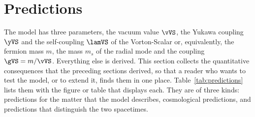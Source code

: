
\section{Predictions}
\label{sec:predictions}

The model has three parameters, the vacuum value $\vVS$, the Yukawa coupling $\yVS$ and the
self-coupling $\lamVS$ of the Vorton-Scalar or, equivalently, the fermion mass $m$, the mass $m_s$
of the radial mode and the coupling $\gVS=m/\vVS$. Everything else is derived. This section collects
the quantitative consequences that the preceding sections derived, so that a reader who wants to
test the model, or to extend it, finds them in one place. Table~\ref{tab:predictions} lists them
with the figure or table that displays each. They are of three kinds: predictions for the matter
that the model describes, cosmological predictions, and predictions that distinguish the two
spacetimes.

